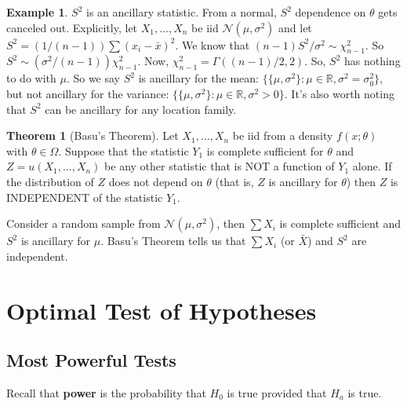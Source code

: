 \documentclass{book}
\theoremstyle{definition}
\newtheorem{thm}{Theorem}[section]
\newtheorem{exmp}{Example}[section]
\newcommand{\N}{\mathcal{N}}
\begin{document}
\begin{exmp}
	$S^2$ is an ancillary statistic. From a normal, $S^2$ dependence on $\theta$ gets canceled out. Explicitly, let $X_1,\dots,X_n$ be iid $\N(\mu,\sigma^2)$ and let $S^2 = (1/(n-1))\sum (x_i - \bar{x})^2$. We know that $(n-1)S^2/\sigma^2 \sim \chi^2_{n-1}$. So $S^2 \sim (\sigma^2/(n-1)) \chi^2_{n-1}$. Now, $\chi^2_{n-1} = \Gamma((n-1)/2, 2)$. So, $S^2$ has nothing to do with $\mu$. So we say $S^2$ is ancillary for the mean: $\{ \{ \mu,\sigma^2 \}: \mu \in \mathbb{R}, \sigma^2  = \sigma_0^2 \}$, but not ancillary for the variance: $\{ \{ \mu,\sigma^2 \}: \mu \in \mathbb{R}, \sigma^2  > 0 \}$. It's also worth noting that $S^2$ can be ancillary for any location family. 
\end{exmp}



\begin{thm}[Basu's Theorem]
	Let $X_1,\dots,X_n$ be iid from a density $f(x;\theta)$ with $\theta \in \Omega$. Suppose that the statistic $Y_1$ is complete sufficient for $\theta$ and $Z = u(X_1,\dots,X_n)$ be any other statistic that is NOT a function of $Y_1$ alone. If the distribution of $Z$ does not depend on $\theta$ (that is, $Z$ is ancillary for $\theta$) then $Z$ is INDEPENDENT of the statistic $Y_1$.  
\end{thm}

Consider a random sample from $\N(\mu,\sigma^2)$, then $\sum X_i$ is complete sufficient and $S^2$ is ancillary for $\mu$. Basu's Theorem tells us that $\sum X_i$ (or $\bar{X}$) and $S^2$ are independent. 


\newpage



\chapter{Optimal Test of Hypotheses}

\newpage



\section{Most Powerful Tests}

Recall that \textbf{power} is the probability that $H_0$ is true provided that $H_a$ is true.
\end{document}
